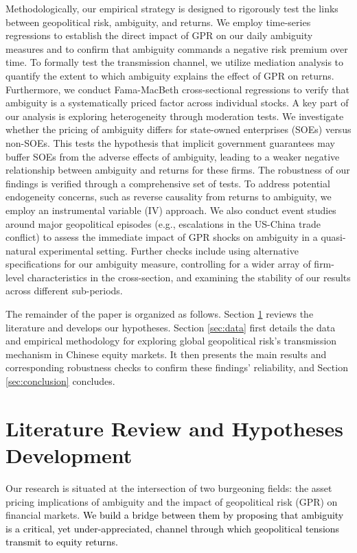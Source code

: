 \documentclass[preprint,12pt,authoryear]{elsarticle}
\begin{document}
Methodologically, our empirical strategy is designed to rigorously test the links between geopolitical risk, ambiguity, and returns. We employ time-series regressions to establish the direct impact of GPR on our daily ambiguity measures and to confirm that ambiguity commands a negative risk premium over time. To formally test the transmission channel, we utilize mediation analysis to quantify the extent to which ambiguity explains the effect of GPR on returns. Furthermore, we conduct Fama-MacBeth cross-sectional regressions to verify that ambiguity is a systematically priced factor across individual stocks. A key part of our analysis is exploring heterogeneity through moderation tests. We investigate whether the pricing of ambiguity differs for state-owned enterprises (SOEs) versus non-SOEs. This tests the hypothesis that implicit government guarantees may buffer SOEs from the adverse effects of ambiguity, leading to a weaker negative relationship between ambiguity and returns for these firms. The robustness of our findings is verified through a comprehensive set of tests. To address potential endogeneity concerns, such as reverse causality from returns to ambiguity, we employ an instrumental variable (IV) approach. We also conduct event studies around major geopolitical episodes (e.g., escalations in the US-China trade conflict) to assess the immediate impact of GPR shocks on ambiguity in a quasi-natural experimental setting. Further checks include using alternative specifications for our ambiguity measure, controlling for a wider array of firm-level characteristics in the cross-section, and examining the stability of our results across different sub-periods.

The remainder of the paper is organized as follows. Section \ref{sec:literature} reviews the literature and develops our hypotheses. Section \ref{sec:data} first details the data and empirical methodology for exploring global geopolitical risk’s transmission mechanism in Chinese equity markets. It then presents the main results and corresponding robustness checks to confirm these findings’ reliability, and Section \ref{sec:conclusion} concludes.

\section{Literature Review and Hypotheses Development}
\label{sec:literature}

Our research is situated at the intersection of two burgeoning fields: the asset pricing implications of ambiguity and the impact of geopolitical risk (GPR) on financial markets. \textcolor{black}{ We build a bridge between them by proposing that ambiguity is a critical, yet under-appreciated, channel through which geopolitical tensions transmit to equity returns.}
\end{document}

